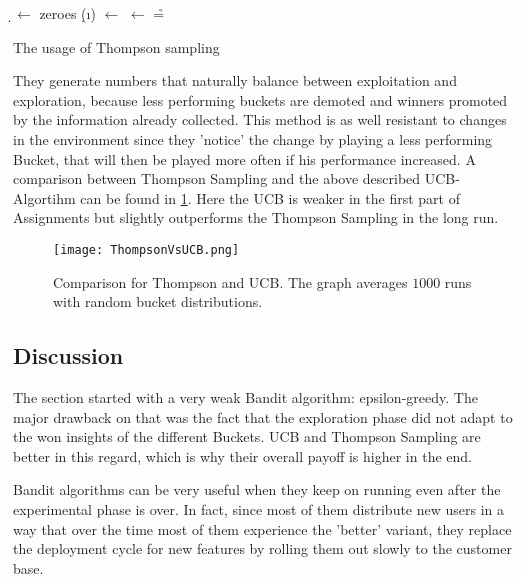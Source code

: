 \documentclass[main.tex]{subfiles}
\begin{document}
\begin{algorithm}
\KwIn{\b}
\BlankLine
\d $\leftarrow$ zeroes \;
{
\d(\i) $\leftarrow$ \draw{\b{\i}}
}
\nb $\leftarrow$ \max{\d} \;
\r = \rw{\nb}\;

\caption[Thompson Sampling]{The usage of Thompson sampling}
\label{alg:ThompsonSampling}
\end{algorithm}

They generate numbers that naturally balance between exploitation and exploration, because less performing buckets are demoted and winners promoted by the information already collected. This method is as well resistant to changes in the environment since they 'notice' the change by playing a less performing Bucket, that will then be played more often if his performance increased. A comparison between Thompson Sampling and the above described UCB-Algortihm can be found in \ref{fig:ThompsonVsUCB}. Here the UCB is weaker in the first part of Assignments but slightly outperforms the Thompson Sampling in the long run. 

\begin{figure}[ht]
\texttt{[image: ThompsonVsUCB.png]}
\centering
\caption{Comparison for Thompson and UCB. The graph averages $1000$ runs with random bucket distributions.}
\label{fig:ThompsonVsUCB}
\end{figure}

\subsection{Discussion}
The section started with a very weak Bandit algorithm: epsilon-greedy. The major drawback on that was the fact that the exploration phase did not adapt to the won insights of the different Buckets. UCB and Thompson Sampling are better in this regard, which is why their overall payoff is higher in the end. 

Bandit algorithms can be very useful when they keep on running even after the experimental phase is over. In fact, since most of them distribute new users in a way that over the time most of them experience the 'better' variant, they replace the deployment cycle for new features by rolling them out slowly to the customer base.
\end{document}
